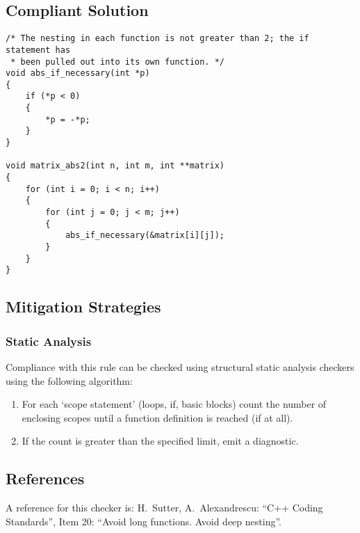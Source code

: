 \subsection{Compliant Solution}

\begin{verbatim}
/* The nesting in each function is not greater than 2; the if statement has
 * been pulled out into its own function. */
void abs_if_necessary(int *p)
{
    if (*p < 0)
    {
        *p = -*p;
    }
}

void matrix_abs2(int n, int m, int **matrix)
{
    for (int i = 0; i < n; i++)
    {
        for (int j = 0; j < m; j++)
        {
            abs_if_necessary(&matrix[i][j]);
        }
    }
}
\end{verbatim}

\subsection{Mitigation Strategies}
\subsubsection{Static Analysis} 

Compliance with this rule can be checked using structural static analysis checkers using the following algorithm:

\begin{enumerate}
\item For each `scope statement' (loops, if, basic blocks) count the number of
enclosing scopes until a function definition is reached (if at all).
\item If the count is greater than the specified limit, emit a diagnostic.
\end{enumerate}

\subsection{References}

A reference for this checker is: H.~Sutter, A.~Alexandrescu:
``C++ Coding Standards'', Item 20: ``Avoid long functions. Avoid deep nesting''.
